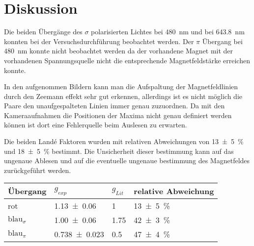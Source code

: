 \newpage
\section{Diskussion}
\label{sec:diskussion}
Die beiden Übergänge des $\sigma$ polarisierten Lichtes bei \SI{480}{\nano\metre} und bei \SI{643,8}{\nano\metre} konnten bei der Versuchsdurchführung beobachtet werden.
Der $\pi$ Übergang bei \SI{480}{\nano\metre} konnte nicht beobachtet werden da der vorhandene Magnet mit der vorhandenen Spannungsquelle nicht die entsprechende Magnetfeldstärke erreichen konnte.

In den aufgenommen Bildern kann man die Aufspaltung der Magnetfeldlinien durch den Zeemann effekt sehr gut erkennen, allerdings ist es nicht möglich die Paare den unaufgespalteten Linien immer genau zuzuordnen.
Da mit den Kameraaufnahmen die Positionen der Maxima nicht genau definiert werden können ist dort eine Fehlerquelle beim Auslesen zu erwarten.

Die beiden Landé Faktoren wurden mit relativen Abweichungen von \SI{13+-5}{\percent} und \SI{18+-5}{\percent} bestimmt.
Die Unsicherheit dieser bestimmung kann auf das ungenaue Ablesen und auf die eventuelle ungenaue bestimmung des Magnetfeldes zurückgeführt werden.
\vspace{2cm}

\centering
\begin{tabular}[h]{|l|l|l|l|}
    \hline
    Übergang & $g_{exp}$ & $g_{Lit}$ & relative Abweichung\\
    \hline
    rot & \num{1.13+-0.06} & \num{1} & \SI{13+-5}{\percent}\\
    $\text{blau}_{\sigma}$ & \num{1.00+-0.06} & \num{1.75} & \SI{42+-3}{\percent}\\
    $\text{blau}_{\pi}$ & \num{0.738+-0.023} & \num{0.5} & \SI{47+-4}{\percent}\\
    \hline
\end{tabular}